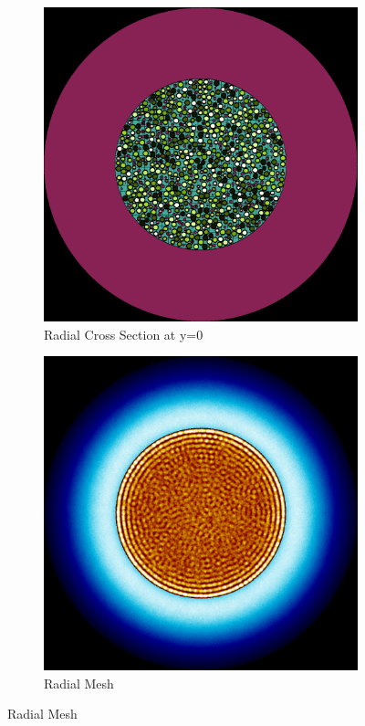 \begin{figure}[H]
\centering

\begin{subfigure}{0.45\textwidth}
  \includegraphics[width=0.95\linewidth]{figures/3456012/3456012-r}
  \caption{Radial Cross Section at y=0}
  \label{fig:3456012-r}
\end{subfigure}%
%
\begin{subfigure}{0.45\textwidth}
  \includegraphics[width=0.95\linewidth]{figures/3456012/3456012-rm}
  \caption{Radial Mesh}
  \label{fig:3456012-rm}
\end{subfigure}


\end{figure}

